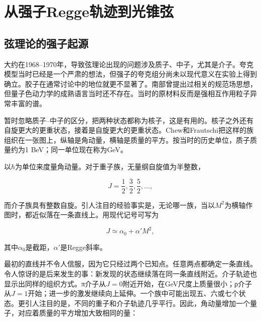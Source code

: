\chapter{从强子Regge轨迹到光锥弦}


\section{弦理论的强子起源}

大约在1968--1970年，导致弦理论出现的问题涉及质子、中子，尤其是介子。夸克模型当时已经是一个严肃的想法，但强子的夸克组分尚未以现代意义在实验上得到确立。胶子在通常讨论中的地位就更不显著了。南部曾提出过相关的规范场思想，但量子色动力学的成熟语言当时还不存在。当时的原材料反而是强相互作用粒子异常丰富的谱。

暂时忽略质子--中子的区分，把两种状态都称为核子，这是有用的。核子之外还有自旋更大的更重状态，接着是自旋更大的更重状态。Chew和Frautschi把这样的族组织在一张图上，纵轴是角动量，横轴是质量的平方。按当时的历史单位，质子质量约为1 BeV；同一单位现在称为GeV。

以\(\hbar\)为单位来度量角动量。对于重子族，无量纲自旋值为半整数，

\begin{equation}
  J=\frac12,\frac32,\frac52,\ldots,
\end{equation}

而介子族具有整数自旋。引人注目的经验事实是，无论哪一族，当以\(M^2\)为横轴作图时，都近似落在一条直线上。用现代记号可写为

\begin{equation}
  J\simeq \alpha_0+\alpha' M^2,
  \label{eq:l01-regge-trajectory}
\end{equation}

其中\(\alpha_0\)是截距，\(\alpha'\)是Regge斜率。

最初的直线并不令人信服，因为它只经过两个已知点。任意两点都确定一条直线。令人惊讶的是后来发生的事：新发现的状态继续落在同一条直线附近。介子轨迹也显示出同样的组织方式。{\proseunicodefont π}介子从\(J=0\)附近开始，在GeV尺度上质量很小；{\proseunicodefont ρ}介子从\(J=1\)开始；进一步的激发继续向上延伸。一个族中可能出现五、六或七个状态。更引人注目的是，不同的重子和介子轨迹几乎平行。因此，角动量增加一个量子，对应着质量的平方增加大致相同的量：

